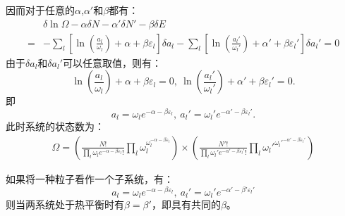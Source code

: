 \documentclass[a4paper,12pt]{article}
\begin{document}
因而对于任意的$\alpha$,$\alpha'$和$\beta$都有：
\begin{equation}\nonumber
\begin{aligned}
	&\delta \ln \Omega - \alpha \delta N - \alpha' \delta N' - \beta \delta E \\
	=& -\sum_l \left[ \ln \left( \frac{a_l}{\omega_l} \right) + \alpha + \beta \varepsilon_l \right] \delta a_l - \sum_l \left[ \ln \left( \frac{a_l'}{\omega_l'} \right) + \alpha' + \beta \varepsilon_l' \right] \delta a_l' = 0
\end{aligned}
\end{equation}
由于$\delta a_l$和$\delta a_l'$可以任意取值，则有：
\begin{equation}\nonumber
	\ln \left( \frac{a_l}{\omega_l} \right) + \alpha + \beta \varepsilon_l = 0,~ \ln \left( \frac{a_l'}{\omega_l'} \right) + \alpha' + \beta \varepsilon_l' = 0.
\end{equation}
即
\begin{equation}\nonumber
	a_l = \omega_l e^{-\alpha - \beta \varepsilon_l}, ~ a_l' = \omega_l' e^{-\alpha' - \beta \varepsilon_l'}.
\end{equation}
此时系统的状态数为：
\begin{equation}\nonumber
\begin{aligned}
	\Omega = \left( \frac{N!}{\prod\limits_l \omega_le^{-\alpha-\beta\varepsilon_l}!}\prod\limits_l \omega_l^{\omega_l^{-\alpha-\beta\varepsilon_l}} \right) \times \left( \frac{N'!}{\prod\limits_l \omega_l'e^{-\alpha'-\beta\varepsilon_l'}!}\prod\limits_l \omega_l'^{\omega_l'^{-\alpha'-\beta\varepsilon_l'}} \right)
\end{aligned}
\end{equation}

如果将一种粒子看作一个子系统，有：
\begin{equation}\nonumber
	a_l = \omega_l e^{-\alpha - \beta \varepsilon_l}, ~ a_l' = \omega_l' e^{-\alpha' - \beta' \varepsilon_l'}
\end{equation}
则当两系统处于热平衡时有$\beta = \beta'$，即具有共同的$\beta$。


\section{}
\end{document}
